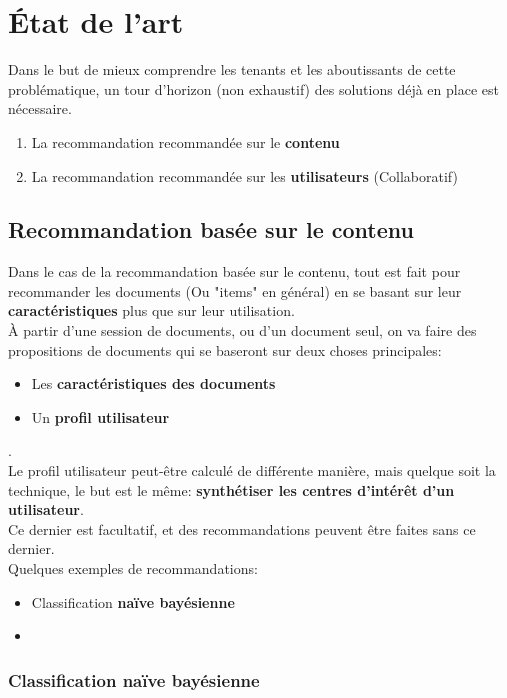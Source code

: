 \chapter{État de l'art}
    Dans le but de mieux comprendre les tenants et les aboutissants de cette problématique, un tour d'horizon (non exhaustif) des solutions déjà en place est nécessaire.
    \begin{enumerate}
        \item La recommandation recommandée sur le \textbf{contenu}
        \item La recommandation recommandée sur les \textbf{utilisateurs} (Collaboratif)
    \end{enumerate}

    \section{Recommandation basée sur le contenu}
    Dans le cas de la recommandation basée sur le contenu, tout est fait pour recommander les documents (Ou "items" en général) en se basant sur leur \textbf{caractéristiques} plus que sur leur utilisation.\\
        À partir d'une session de documents, ou d'un document seul, on va faire des propositions de documents qui se baseront sur deux choses principales:
        \begin{itemize}
            \item Les \textbf{caractéristiques des documents}
            \item Un \textbf{profil utilisateur}
        \end{itemize}.\\
        
        Le profil utilisateur peut-être calculé de différente manière, mais quelque soit la technique, le but est le même: \textbf{synthétiser les centres d'intérêt d'un utilisateur}.\\
        Ce dernier est facultatif, et des recommandations peuvent être faites sans ce dernier.\\

        Quelques exemples de recommandations:
        \begin{itemize}
            \item Classification \textbf{naïve bayésienne}
            \item %
        \end{itemize}

        \subsection{Classification naïve bayésienne}
